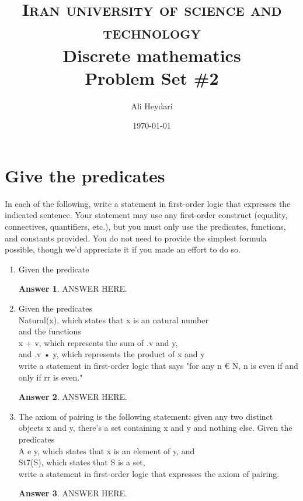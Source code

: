 \documentclass[a4paper]{article}
\title{
\textsc{Iran university of science and technology} \\ [25pt] %
Discrete mathematics\\Problem Set \#2 \\
}
\author{Ali Heydari}
\date{\today}
\renewcommand{\(}{\left(}
\renewcommand{\)}{\right)}
\theoremstyle{plain}
\theoremstyle{plain}
\theoremstyle{definition}
\newtheorem*{answer}{Answer}
\begin{document}
\maketitle

\section{Give the predicates}
In each of the following, write a statement in first-order logic that expresses the indicated sentence. Your statement may use any first-order construct (equality, connectives, quantifiers, etc.), but you must only use the predicates, functions, and constants provided. You do not need to provide the simplest formula possible, though we'd appreciate it if you made an effort to do so.
\begin{enumerate}[label*=\roman*.,ref=\roman*]

\item Given the predicate
\begin{shaded}
\begin{answer}
ANSWER HERE.
\end{answer}
\end{shaded}

\item Given the predicates \\
Natural(x), which states that x is an natural number \\
and the functions \\
x + v, which represents the sum of .v and y, \\
and .v • y, which represents the product of x and y \\
write a statement in first-order logic that says "for any n € N, n is even if and only if rr is even."
\begin{shaded}
\begin{answer}
ANSWER HERE.
\end{answer}
\end{shaded}

\item The axiom of pairing is the following statement: given any two distinct objects x and y, there's a set containing x and y and nothing else. Given the predicates \\
    A e y, which states that x is an element of y, and  \\
    St7(S), which states that S is a set, \\
    write a statement in first-order logic that expresses the axiom of pairing.
\begin{shaded}
\begin{answer}
ANSWER HERE.
\end{answer}
\end{shaded}


\end{enumerate}
\end{document}
